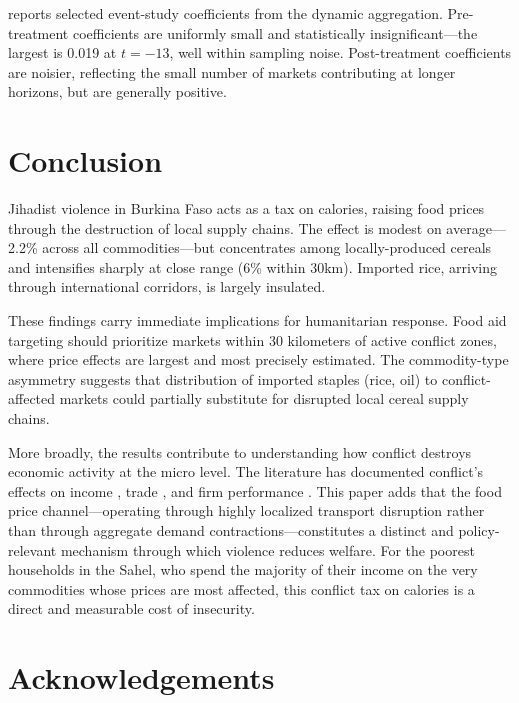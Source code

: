 \documentclass[12pt]{article}
\begin{document}


 reports selected event-study coefficients from the \citet{callaway2021difference} dynamic aggregation. Pre-treatment coefficients are uniformly small and statistically insignificant---the largest is 0.019 at $t = -13$, well within sampling noise. Post-treatment coefficients are noisier, reflecting the small number of markets contributing at longer horizons, but are generally positive.


\section{Conclusion}

Jihadist violence in Burkina Faso acts as a tax on calories, raising food prices through the destruction of local supply chains. The effect is modest on average---2.2\% across all commodities---but concentrates among locally-produced cereals and intensifies sharply at close range (6\% within 30km). Imported rice, arriving through international corridors, is largely insulated.

These findings carry immediate implications for humanitarian response. Food aid targeting should prioritize markets within 30 kilometers of active conflict zones, where price effects are largest and most precisely estimated. The commodity-type asymmetry suggests that distribution of imported staples (rice, oil) to conflict-affected markets could partially substitute for disrupted local cereal supply chains.

More broadly, the results contribute to understanding how conflict destroys economic activity at the micro level. The literature has documented conflict's effects on income \citep{blattman2010civil}, trade \citep{martin2008civil}, and firm performance \citep{amodio2022making}. This paper adds that the food price channel---operating through highly localized transport disruption rather than through aggregate demand contractions---constitutes a distinct and policy-relevant mechanism through which violence reduces welfare. For the poorest households in the Sahel, who spend the majority of their income on the very commodities whose prices are most affected, this conflict tax on calories is a direct and measurable cost of insecurity.


\section*{Acknowledgements}
\end{document}
